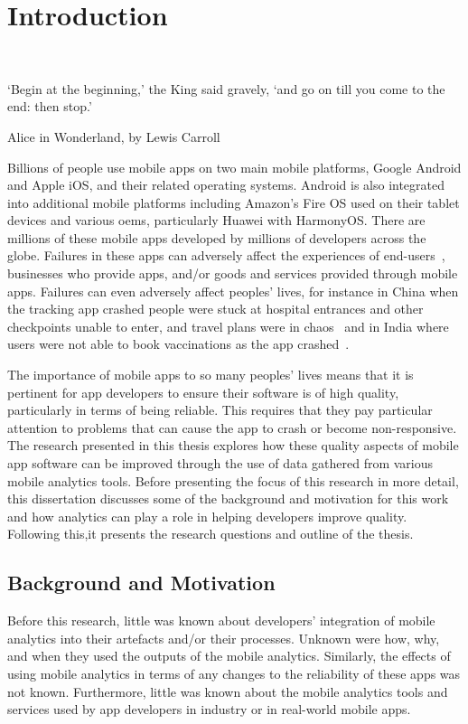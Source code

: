 \setchapterpreamble[u]{\margintoc} 
\chapter{Introduction}~\label{chapter-introduction}

\epigraph{`Begin at the beginning,' the King said gravely, `and go on till you come to the end: then stop.'}{Alice in Wonderland, by Lewis Carroll}

\bigskip

Billions of people use mobile apps on two main mobile platforms, Google Android and Apple iOS, and their related operating systems.  Android is also integrated into additional mobile platforms including Amazon's Fire OS used on their tablet devices and various \glspl{oem}, particularly Huawei with HarmonyOS. There are millions of these mobile apps developed by millions of developers across the globe. Failures in these apps can adversely affect the experiences of end-users~, businesses who provide apps, and/or goods and services provided through mobile apps. Failures can even adversely affect peoples' lives, for instance in China when the  tracking app crashed people were stuck at hospital entrances and other checkpoints unable to enter, and travel plans were in chaos~ and in India where users were not able to book vaccinations as the app crashed~.

The importance of mobile apps to so many peoples' lives means that it is pertinent for app developers to ensure their software is of high quality, particularly in terms of being reliable. This requires that they pay particular attention to problems that can cause the app to crash or become non-responsive. The research presented in this thesis explores how these quality aspects of mobile app software can be improved through the use of data gathered from various mobile analytics tools. Before presenting the focus of this research in more detail, this dissertation discusses some of the background and motivation for this work and how analytics can play a role in helping developers improve quality. Following this,it presents the research questions and outline of the thesis.

\section{Background and Motivation}
Before this research, little was known about developers' integration of mobile analytics into their artefacts and/or their processes. Unknown were how, why, and when they used the outputs of the mobile analytics. Similarly, the effects of using mobile analytics in terms of any changes to the reliability of these apps was not known. Furthermore, little was known about the mobile analytics tools and services used by app developers in industry or in real-world mobile apps.

